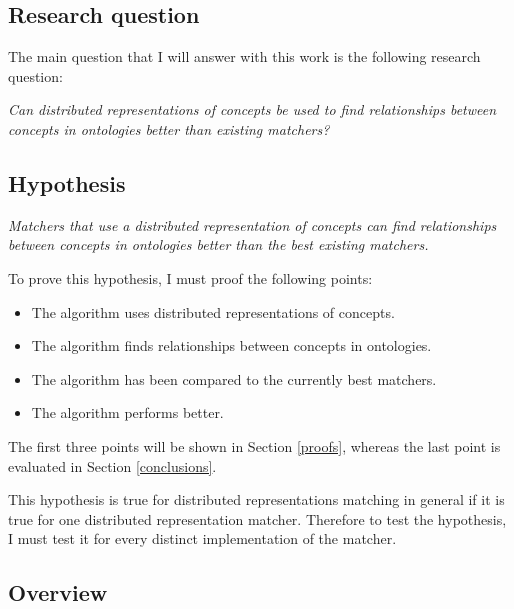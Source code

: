 \documentclass{article}
\begin{document}
 \subsection{Research question} \label{researchquestion}
 The main question that I will answer with this work is the following research question:
 
 \begin{center}
 \textit{
 Can distributed representations of concepts be used to find relationships between concepts in ontologies better than existing matchers?
 }
 \end{center}
 
 \subsection{Hypothesis} \label{hypotheses}
 
 \begin{center}
 \textit{Matchers that use a distributed representation of concepts can find relationships between concepts in ontologies better than the best existing matchers.}
 \end{center}

 To prove this hypothesis, I must proof the following points:
 \begin{itemize}
 \item The algorithm uses distributed representations of concepts.
 \item The algorithm finds relationships between concepts in ontologies.
 \item The algorithm has been compared to the currently best matchers.
 \item The algorithm performs better.
 \end{itemize} 
 
 The first three points will be shown in Section \ref{proofs}, whereas the last point is evaluated in Section \ref{conclusions}.
 
 This hypothesis is true for distributed representations matching in general if it is true for one distributed representation matcher. Therefore to test the hypothesis, I must test it for every distinct implementation of the matcher.
 
 \subsection{Overview} %
\end{document}
